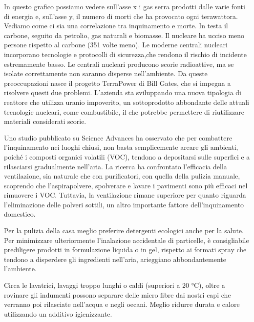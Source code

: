 \documentclass[12pt]{book} %
\begin{document}
In questo grafico possiamo vedere sull'asse x i gas serra prodotti dalle varie fonti di energia e, sull'asse y, il numero di morti che ha provocato ogni terawattora. Vediamo come ci sia una correlazione tra inquinamento e morte. In testa il carbone, seguito da petrolio, gas naturali e biomasse. 
Il nucleare ha ucciso meno persone rispetto al carbone (351 volte meno). Le moderne centrali nucleari incorporano tecnologie e protocolli di sicurezza,che rendono il rischio di incidente estremamente basso. 
Le centrali nucleari producono scorie radioattive, ma se isolate correttamente non saranno disperse nell'ambiente. Da queste preoccupazioni nasce il progetto TerraPower di Bill Gates, che si impegna a risolvere questi due problemi. L'azienda sta sviluppando una nuova tipologia di reattore che utilizza uranio impoverito, un sottoprodotto abbondante delle attuali tecnologie nucleari, come combustibile, il che potrebbe permettere di riutilizzare materiali considerati scorie. 

\begin{mdframed}[linewidth=1pt]
Uno studio pubblicato su Science Advances ha osservato che per combattere l’inquinamento nei luoghi chiusi, non basta semplicemente areare gli ambienti, poiché i composti organici volatili (VOC), tendono a depositarsi sulle superfici e a rilasciarsi gradualmente nell’aria. La ricerca ha confrontato l’efficacia della ventilazione, sia naturale che con purificatori, con quella della pulizia manuale, scoprendo che l’aspirapolvere, spolverare e lavare i pavimenti sono più efficaci nel rimuovere i VOC. Tuttavia, la ventilazione rimane superiore per quanto riguarda l’eliminazione delle polveri sottili, un altro importante fattore dell’inquinamento domestico.

Per la pulizia della casa meglio preferire detergenti ecologici anche per la salute. Per minimizzare ulteriormente l'inalazione accidentale di particelle, è consigliabile prediligere prodotti in formulazione liquida o in gel, rispetto ai formati spray che tendono a disperdere gli ingredienti nell'aria, arieggiano abbondantemente l'ambiente.

Circa le lavatrici, lavaggi troppo lunghi o caldi (superiori a 20 °C), oltre a rovinare gli indumenti possono separare delle micro fibre dai nostri capi che verranno poi rilasciate nell'acqua e negli oecani. Meglio ridurre durata e calore utilizzando un additivo igienizzante.
\end{mdframed}
\end{document}
